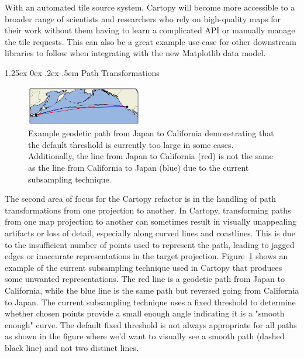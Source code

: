 \documentclass[12pt]{article}
\makeatletter
\numberwithin{page}{section}
\renewcommand{\paragraph}{%
  \@startsection{paragraph}{4}%
  {\z@}{1.25ex \@plus 0ex \@minus .2ex}{-.5em}%
  {\normalfont\normalsize\itshape\bfseries}%
}
\makeatother
\begin{document}
With an automated tile source system, Cartopy will become more accessible to a broader range of
scientists and researchers who rely on high-quality maps for their work without them having to learn
a complicated API or manually manage the tile requests. This can also be a great example use-case for other
downstream libraries to follow when integrating with the new Matplotlib data model.

\paragraph{Path Transformations}

\begin{figure}
  \includegraphics[width=0.45\textwidth]{supplemental/cartopy_interpolation}
  \caption{\small Example geodetic path from Japan to California demonstrating
  that the default threshold is currently too large in some cases. Additionally,
  the line from Japan to California (red) is not the same as the line from
  California to Japan (blue) due to the current subsampling technique.}
  \label{fig:cartopy_interpolation}
\end{figure}

The second area of focus for the Cartopy refactor is in the handling of path transformations from
one projection to another. In Cartopy, transforming paths from one map projection to another can
sometimes result in visually unappealing artifacts or loss of detail,
especially along curved lines and coastlines. This is due to the insufficient
number of points used to represent the path, leading to jagged edges or inaccurate
representations in the target projection.
Figure~\ref{fig:cartopy_interpolation} shows an example of the current subsampling technique
used in Cartopy that produces some unwanted representations.
The red line is a geodetic path from Japan to California, while the blue line
is the same path but reversed going from California to Japan. The current subsampling technique
uses a fixed threshold to determine whether chosen points provide a small enough angle indicating
it is a "smooth enough" curve. The default fixed threshold is not always appropriate for all
paths as shown in the figure where we'd want to visually see a smooth path (dashed black line) and not two distinct lines.
\end{document}
